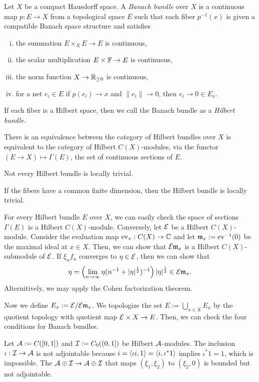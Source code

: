\documentclass{../../small}
\begin{document}
\begin{ex}
Let $X$ be a compact Hausdorff space.
A \emph{Banach bundle} over $X$ is a continuous map $p:E\to X$ from a topological space $E$ such that each fiber $p^{-1}(x)$ is given a compatible Banach space structure and satisfies
\begin{enumerate}[(i)]
\item the summation $E\times_X E\to E$ is continuous,
\item the scalar multiplication $E\times\mathbb{F}\to E$ is continuous,
\item the norm function $X\to\mathbb{R}_{\ge0}$ is continuous,
\item for a net $e_i\in E$ if $p(e_i)\to x$ and $\|e_i\|\to0$, then $e_i\to 0\in E_x$.
\end{enumerate}
If each fiber is a Hilbert space, then we call the Banach bundle as a \emph{Hilbert bundle}.
\begin{parts}
\item There is an equivalence between the category of Hilbert bundles over $X$ is equivalent to the category of Hilbert $C(X)$-modules,
via the functor $(E\to X)\mapsto\Gamma(E)$, the set of continuous sections of $E$.
\item Not every Hilbert bundle is locally trivial.
\item If the fibers have a common finite dimension, then the Hilbert bundle is locally trivial.
\end{parts}
\end{ex}
\begin{pf}
For every Hilbert bundle $E$ over $X$, we can easily check the space of sections $\Gamma(E)$ is a Hilbert $C(X)$-module.
Conversely, let $\mathcal{E}$ be a Hilbert $C(X)$-module.
Consider the evaluation map $\operatorname{ev}_x:C(X)\to\mathbb{C}$ and let $\mathfrak{m}_x:=\operatorname{ev}^{-1}(0)$ be the maximal ideal at $x\in X$.
Then, we can show that $\mathcal{E}\mathfrak{m}_x$ is a Hilbert $C(X)$-submodule of $\mathcal{E}$.
If $\xi_nf_n$ converges to $\eta\in\mathcal{E}$, then we can show that
\[\eta=\left(\lim_{n\to\infty}\eta(n^{-1}+|\eta|^{\frac12})^{-1}\right)|\eta|^{\frac12}\in\mathcal{E}\mathfrak{m}_x.\]
Alternitively, we may apply the Cohen factorization theorem.

Now we define $E_x:=\mathcal{E}/\mathcal{E}\mathfrak{m}_x$.
We topologize the set $E:=\bigcup_{x\in X}E_x$ by the quotient topology with quotient map $\mathcal{E}\times X\to E$.
Then, we can check the four conditions for Banach bundles.
\end{pf}

\begin{ex}
Let $\mathcal{A}:=C([0,1])$ and $\mathcal{I}:=C_0((0,1])$ be Hilbert $\mathcal{A}$-modules.
The inclusion $\iota:\mathcal{I}\to\mathcal{A}$ is not adjointable because $i=\langle\iota i,1\rangle=\langle i,\iota^* 1\rangle$ implies $\iota^*1=1$, which is impossible.
The $\mathcal{A}\oplus\mathcal{I}\to\mathcal{A}\oplus\mathcal{I}$ that maps $(\xi_1,\xi_2)$ to $(\xi_2,0)$ is bounded but not adjointable.
\end{ex}
\end{document}
